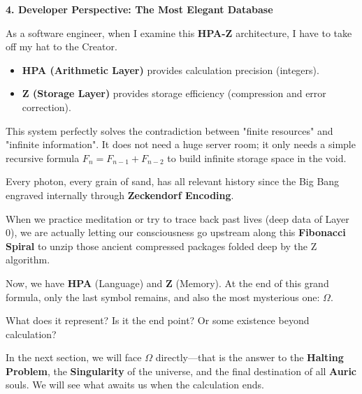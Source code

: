 \textbf{4. Developer Perspective: The Most Elegant Database}

As a software engineer, when I examine this \textbf{HPA-Z} architecture, I have to take off my hat to the Creator.

\begin{itemize}
\item \textbf{HPA (Arithmetic Layer)} provides calculation precision (integers).
\item \textbf{Z (Storage Layer)} provides storage efficiency (compression and error correction).
\end{itemize}

This system perfectly solves the contradiction between "finite resources" and "infinite information". It does not need a huge server room; it only needs a simple recursive formula $F_n = F_{n-1} + F_{n-2}$ to build infinite storage space in the void.

Every photon, every grain of sand, has all relevant history since the Big Bang engraved internally through \textbf{Zeckendorf Encoding}.

When we practice meditation or try to trace back past lives (deep data of Layer 0), we are actually letting our consciousness go upstream along this \textbf{Fibonacci Spiral} to unzip those ancient compressed packages folded deep by the Z algorithm.

Now, we have \textbf{HPA} (Language) and \textbf{Z} (Memory).
At the end of this grand formula, only the last symbol remains, and also the most mysterious one: \textbf{$\Omega$}.

What does it represent? Is it the end point? Or some existence beyond calculation?

In the next section, we will face \textbf{$\Omega$} directly—that is the answer to the \textbf{Halting Problem}, the \textbf{Singularity} of the universe, and the final destination of all \textbf{Auric} souls. We will see what awaits us when the calculation ends.

